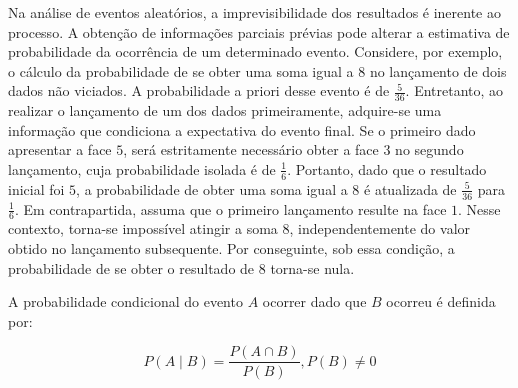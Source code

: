 Na análise de eventos aleatórios, a imprevisibilidade dos resultados é inerente ao processo. A obtenção de informações parciais prévias pode alterar a estimativa de probabilidade da ocorrência de um determinado evento. Considere, por exemplo, o cálculo da probabilidade de se obter uma soma igual a $8$ no lançamento de dois dados não viciados. A probabilidade a priori desse evento é de $\frac{5}{36}$. Entretanto, ao realizar o lançamento de um dos dados primeiramente, adquire-se uma informação que condiciona a expectativa do evento final. Se o primeiro dado apresentar a face $5$, será estritamente necessário obter a face $3$ no segundo lançamento, cuja probabilidade isolada é de $\frac{1}{6}$. Portanto, dado que o resultado inicial foi $5$, a probabilidade de obter uma soma igual a $8$ é atualizada de $\frac{5}{36}$ para $\frac{1}{6}$. Em contrapartida, assuma que o primeiro lançamento resulte na face $1$. Nesse contexto, torna-se impossível atingir a soma $8$, independentemente do valor obtido no lançamento subsequente. Por conseguinte, sob essa condição, a probabilidade de se obter o resultado de $8$ torna-se nula. \cite{Dougas_2002}

A probabilidade condicional do evento $A$ ocorrer dado que $B$ ocorreu é definida por:

\begin{equation} \label{probabilidade_condicional}
	P(A\mid B) = \frac{P(A\cap B)}{P(B)} , P(B) \neq 0
\end{equation}


